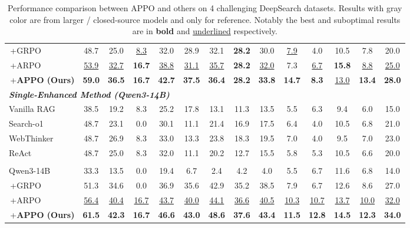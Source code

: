 \documentclass{llmxive}
\begin{document}
\begin{table}[t]
{\begin{tabular}{lccccccccccccc}
\,+GRPO &  {48.7} &  {25.0} & \underline{8.3} & 32.0 & 28.9 & 32.1 & \textbf{28.2} & 30.0 & \underline{7.9} & 4.0 & 10.5 & 7.8 & 20.0   \\
\,+ARPO & \underline{53.9} & \underline{32.7} & \textbf{16.7} & \underline{38.8} & \underline{31.1} & \underline{35.7} & \textbf{28.2} & \underline{32.0} & 7.3 & \underline{6.7} & \textbf{15.8} & \underline{8.8} & \underline{25.0}   \\ 
\rowcolor{gray!20}
\,+\textbf{APPO (Ours)} & \textbf{59.0} & \textbf{36.5} & \textbf{16.7} & \textbf{42.7} & \textbf{37.5}  & \textbf{36.4} & \textbf{28.2} & \textbf{33.8} &\textbf{14.7} & \textbf{8.3 }&\underline{13.0}  &\textbf{13.4}  & \textbf{28.0}  \\ \hline
\multicolumn{14}{l}{\textbf{\textit{Single-Enhanced Method (Qwen3-14B)}}} \\ 
Vanilla RAG & 38.5 & 19.2 & 8.3 & 25.2 & 17.8 & 13.1 & 11.3 & 13.5 & 5.5 & 6.3 & 9.4 & 6.0 & 15.0   \\
Search-o1 & 48.7 & 23.1 & 0.0 & 30.1 & 11.1 & 21.4 & 16.9 & 17.5 & 6.4 & 4.0 & 10.5 & 6.8 & 21.0   \\
WebThinker & 48.7 & 26.9 & 8.3 & 33.0 & 13.3 & 23.8 & 18.3 & 19.5 & 7.0 & 4.0 & 9.5 & 7.0 & 23.0   \\
ReAct & 48.7 & 25.0 & 8.3 & 32.0 & 11.1 & 20.2 & 12.7 & 15.5 & 5.8 & 5.3 & 10.5 & 6.6 & 20.0  \\ \hdashline
\multicolumn{14}{l}{\textbf{\textit{RL-based Method (Qwen3-14B)}}} \\ 
Qwen3-14B & 33.3 & 13.5 & 0.0 & 19.4 & 6.7 & 2.4 & 4.2 & 4.0 & 5.5 & 6.7 & 11.6 & 6.8 & 14.0  \\
\,+GRPO & 51.3 & 34.6 & 0.0 & 36.9 & 35.6 & 42.9 & 35.2 & 38.5 & 7.9 & 6.7 & 12.6 & 8.6 & 27.0   \\
\,+ARPO & \underline{56.4} & \underline{40.4} & \underline{16.7} & \underline{43.7} & \underline{40.0} & \underline{44.1} & \underline{36.6} & \underline{40.5} & \underline{10.3} & \underline{10.7} & \underline{13.7} & \underline{10.0} & \underline{32.0}   \\ 
\rowcolor{gray!20}
\,+\textbf{APPO (Ours)} & \textbf{61.5} & \textbf{42.3} & \textbf{16.7} & \textbf{46.6} & \textbf{43.0}  & \textbf{48.6} & \textbf{37.6} & \textbf{43.4} &\textbf{11.5} & \textbf{12.8} &\textbf{14.5}  &\textbf{12.3}  & \textbf{34.0}  \\ \bottomrule[1pt]
\end{tabular}}\vspace{-0.4cm}
\caption{Performance comparison between APPO and others on 4 challenging DeepSearch datasets. Results with gray color are from larger / closed-source models and only for reference. Notably the best and suboptimal results are in \textbf{bold} and \underline{underlined} respectively.}
\end{table}	 	 	 	 	 	 	 	 	 	 	 	 
\end{document}
